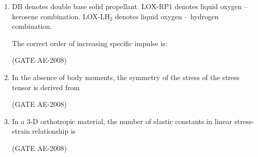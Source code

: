 \documentclass[journal,12pt,onecolumn]{IEEEtran}
\theoremstyle{remark}
\begin{document}
\begin{enumerate}
\quad 

\item DB denotes double base solid propellant.  
LOX-RP1 denotes liquid oxygen -- kerosene combination.  
LOX-LH$_2$ denotes liquid oxygen -- hydrogen combination.  

The correct order of increasing specific impulse is:  

\begin{enumerate}
\end{enumerate} 
\hfill(GATE AE-2008)

\quad 

\item  In the absence of body moments, the symmetry of the stress of the stress tensor is derived from 
\begin{enumerate}
\end{enumerate}
\hfill(GATE AE-2008)

\quad 

\item  In a 3-D orthotropic material, the number of elastic constants in linear stress-strain relationship is
    
    \begin{enumerate}
    \end{enumerate}
\hfill(GATE AE-2008)


\end{enumerate}
\end{document}
